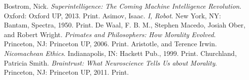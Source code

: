 \documentclass[11pt, oneside]{article}
\begin{document}
\begin{thebibliography}{9}
  Bostrom, Nick. 
  \emph{Superintelligence: The Coming Machine Intelligence Revolution}.
  Oxford: Oxford UP, 2013. 
  Print.
  Asimov, Isaac.
  \emph{I, Robot}.
  New York, NY: Bantam, Spectra, 1950.
  Print.
  De Waal, F. B. M., Stephen Macedo, Josiah Ober, and Robert Wright.
  \emph{Primates and Philosophers: How Morality Evolved}.
  Princeton, NJ: Princeton UP, 2006.
  Print.
  Aristotle, and Terence Irwin.
  \emph{Nicomachean Ethics}.
  Indianapolis, IN: Hackett Pub., 1999.
  Print.
  Churchland, Patricia Smith.
  \emph{Braintrust: What Neuroscience Tells Us about Morality}.
  Princeton, NJ: Princeton UP, 2011. 
  Print.
\end{thebibliography}
\end{document}
